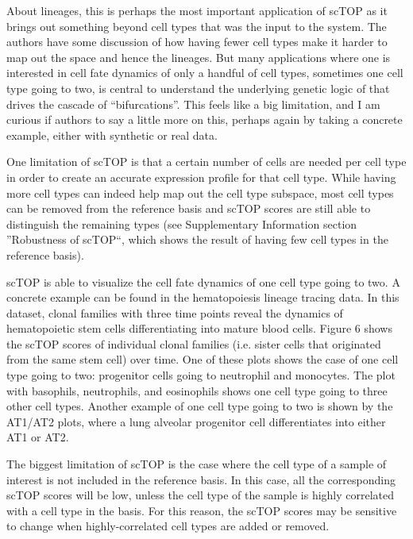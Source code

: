\documentclass[12pt,american]{scrartcl}
\begin{document}
\begin{revcomment}
    About lineages, this is perhaps the most important application of 
scTOP as it brings out something beyond cell types that was the input to
 the system. The authors have some discussion of how having fewer cell 
types make it harder to map out the space and hence the lineages. But 
many applications where one is interested in cell fate dynamics of only a
 handful of cell types, sometimes one cell type going to two, is central
 to understand the underlying genetic logic of that drives the cascade 
of “bifurcations”. This feels like a big limitation, and I am curious if
 authors to say a little more on this, perhaps again by taking a 
concrete example, either with synthetic or real data.
\end{revcomment}
\begin{revresponse}
    One limitation of scTOP is that a certain number of cells are needed per cell type in order to create an accurate expression profile for that cell type. While having more cell types can indeed help map out the cell type subspace, most cell types can be removed from the reference basis and scTOP scores are still able to distinguish the remaining types (see Supplementary Information section ''Robustness of scTOP``, which shows the result of having few cell types in the reference basis). 

    scTOP is able to visualize the cell fate dynamics of one cell type going to two. A concrete example can be found in the hematopoiesis lineage tracing data. In this dataset, clonal families with three time points reveal the dynamics of hematopoietic stem cells differentiating into mature blood cells. Figure 6 shows the scTOP scores of individual clonal families (i.e. sister cells that originated from the same stem cell) over time. One of these plots shows the case of one cell type going to two: progenitor cells going to neutrophil and monocytes. The plot with basophils, neutrophils, and eosinophils shows one cell type going to three other cell types. Another example of one cell type going to two is shown by the AT1/AT2 plots, where a lung alveolar progenitor cell differentiates into either AT1 or AT2.

    The biggest limitation of scTOP is the case where the cell type of a sample of interest is not included in the reference basis. In this case, all the corresponding scTOP scores will be low, unless the cell type of the sample is highly correlated with a cell type in the basis. For this reason, the scTOP scores may be sensitive to change when highly-correlated cell types are added or removed.
\end{revresponse}
\end{document}
